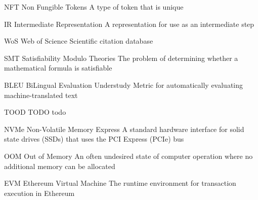 



  {NFT}            %
  {Non Fungible Tokens}  %
  {A type of token that is unique} %

  {IR}            %
  {Intermediate Representation}  %
  {A representation for use as an intermediate step} %
  
  {WoS}            %
  {Web of Science}  %
  {Scientific citation database} %
  
  {SMT}            %
  {Satisfiability Modulo Theories}  %
  {The problem of determining whether a mathematical formula is satisfiable} %

  {BLEU}            %
  {BiLingual Evaluation Understudy}  %
  {Metric for automatically evaluating machine-translated text} %

  {TOOD}            %
  {TODO}  %
  {todo} %
  
  {NVMe}            %
  {Non-Volatile Memory Express}  %
  {A standard hardware interface for solid state drives (SSDs) that uses the PCI Express (PCIe) bus} %
  
  {OOM}            %
  {Out of Memory}  %
  {An often undesired state of computer operation where no additional memory can be allocated} %

  {EVM}            %
  {Ethereum Virtual Machine}  %
  {The runtime environment for transaction execution in Ethereum} %

